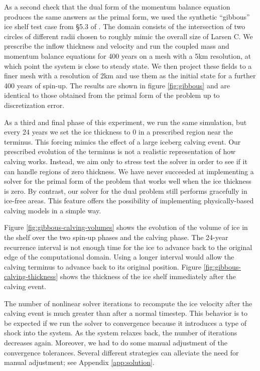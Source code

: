 \documentclass[twocolumn,letterpaper]{igs}
\begin{document}
As a second check that the dual form of the momentum balance equation produces the same answers as the primal form, we used the synthetic ``gibbous'' ice shelf test case from \S5.3 of \citet{shapero2021icepack}.
The domain consists of the intersection of two circles of different radii chosen to roughly mimic the overall size of Larsen C.
We prescribe the inflow thickness and velocity and run the coupled mass and momentum balance equations for 400 years on a mesh with a 5km resolution, at which point the system is close to steady state.
We then project these fields to a finer mesh with a resolution of 2km and use them as the initial state for a further 400 years of spin-up.
The results are shown in figure \ref{fig:gibbous} and are identical to those obtained from the primal form of the problem up to discretization error.

As a third and final phase of this experiment, we run the same simulation, but every 24 years we set the ice thickness to 0 in a prescribed region near the terminus.
This forcing mimics the effect of a large iceberg calving event.
Our prescribed evolution of the terminus is not a realistic representation of how calving works.
Instead, we aim only to stress test the solver in order to see if it can handle regions of zero thickness.
We have never succeeded at implementing a solver for the primal form of the problem that works well when the ice thickness is zero.
By contrast, our solver for the dual problem still performs gracefully in ice-free areas.
This feature offers the possibility of implementing physically-based calving models in a simple way.

Figure \ref{fig:gibbous-calving-volumes} shows the evolution of the volume of ice in the shelf over the two spin-up phases and the calving phase.
The 24-year recurrence interval is not enough time for the ice to advance back to the original edge of the computational domain.
Using a longer interval would allow the calving terminus to advance back to its original position.
Figure \ref{fig:gibbous-calving-thickness} shows the thickness of the ice shelf immediately after the calving event.

The number of nonlinear solver iterations to recompute the ice velocity after the calving event is much greater than after a normal timestep.
This behavior is to be expected if we run the solver to convergence because it introduces a type of shock into the system.
As the system relaxes back, the number of iterations decreases again.
Moreover, we had to do some manual adjustment of the convergence tolerances.
Several different strategies can alleviate the need for manual adjustment; see Appendix \ref{app:solution}.
\end{document}
